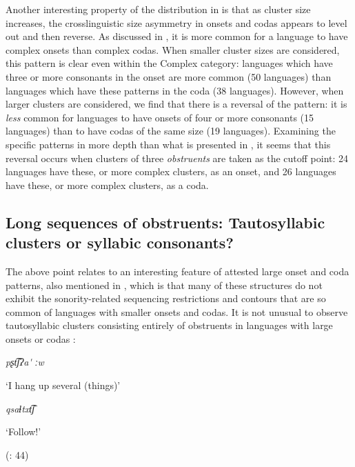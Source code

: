   Another interesting property of the distribution in  is that as cluster size increases, the crosslinguistic size asymmetry in onsets and codas appears to level out and then reverse. As discussed in , it is more common for a language to have complex onsets than complex codas. When smaller cluster sizes are considered, this pattern is clear even within the Complex category: languages which have three or more consonants in the onset are more common (50 languages) than languages which have these patterns in the coda (38 languages). However, when larger clusters are considered, we find that there is a reversal of the pattern: it is \textit{less} common for languages to have onsets of four or more consonants (15 languages) than to have codas of the same size (19 languages). Examining the specific patterns in more depth than what is presented in , it seems that this reversal occurs when clusters of three \textit{obstruents} are taken as the cutoff point: 24 languages have these, or more complex clusters, as an onset, and 26 languages have these, or more complex clusters, as a coda.

\subsection{Long sequences of obstruents: Tautosyllabic clusters or syllabic consonants?}\label{sec:2.2.1}

  The above point relates to an interesting feature of attested large onset and coda patterns, also mentioned in , which is that many of these structures do not exhibit the sonority-related sequencing restrictions and contours that are so common of languages with smaller onsets and codas. It is not unusual to observe tautosyllabic clusters consisting entirely of obstruents in languages with large onsets or codas :

\ea\label{ex:2.3}

  \textit{pʂt͡ʃʔa\'{} ːw}

  ‘I hang up several (things)’

  \citep[36]{Crawford1966}
\z

\ea\label{ex:2.4}

  \textit{qsaɬtxt͡ʃ}

  ‘Follow!’

  (\citealt{GeorgVolodin1999}: 44)
\z

